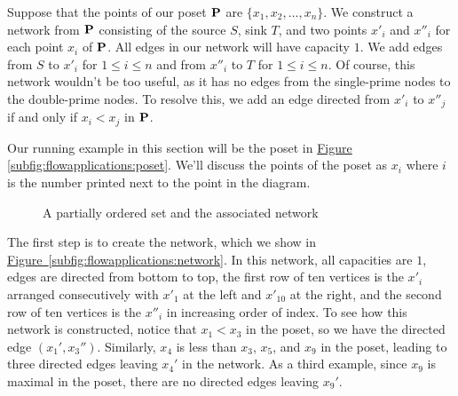 Suppose that the points of our poset $\mathbf{P}$ are
$\{x_1,x_2,\dots,x_n\}$. We construct a network from $\mathbf{P}$ consisting
of the source $S$, sink $T$, and two points $x'_i$ and $x''_i$ for
each point $x_i$ of $\mathbf{P}$. All edges in our network will have
capacity $1$. We add edges from $S$ to $x'_i$ for $1\leq i\leq n$ and
from $x''_i$ to $T$ for $1\leq i\leq n$. Of course, this network
wouldn't be too useful, as it has no edges from the single-prime nodes
to the double-prime nodes. To resolve this, we add an edge directed
from $x'_i$ to $x''_j$ if and only if $x_i < x_j$ in $\mathbf{P}$.

Our running example in this section will be the poset in
\hyperref[subfig:flowapplications:poset]{Figure \ref*{subfig:flowapplications:poset}}.  We'll discuss the points of the
poset as $x_i$ where $i$ is the number printed next to the point in
the diagram.
\begin{figure}[ht]\label{fig:flowapplications:poset}
  \centering
\begin{minipage}{1.3in}
  \end{minipage}\hspace{0.5in}
  \captionsetup[subfloat]{captionskip=15pt}
  \begin{minipage}{2.47in}
  \end{minipage}
  \caption{A partially ordered set %
    \protect{} and the associated network %
    \protect{}}
\end{figure}

The first step is to create the network, which we show in
\hyperref[subfig:flowapplications:network]{Figure~\ref*{subfig:flowapplications:network}}.
In this network, all capacities are $1$, edges are directed from
bottom to top, the first row of ten vertices is the $x'_i$ arranged
consecutively with $x'_1$ at the left and $x'_{10}$ at the right, and
the second row of ten vertices is the $x''_i$ in increasing order of
index. To see how this network is constructed, notice that $x_1<x_3$
in the poset, so we have the directed edge $(x_1',x_3'')$. Similarly,
$x_4$ is less than $x_3$, $x_5$, and $x_9$ in the poset, leading to
three directed edges leaving $x_4'$ in the network. As a third
example, since $x_9$ is maximal in the poset, there are no directed
edges leaving $x_9'$.


